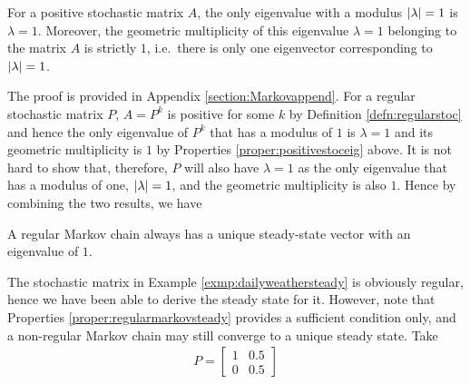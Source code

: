 \begin{proper}
\label{proper:positivestoceig}
For a positive stochastic matrix $A$, the only eigenvalue with a modulus $\abs{\lambda} = 1$ is $\lambda = 1$. Moreover, the geometric multiplicity of this eigenvalue $\lambda = 1$ belonging to the matrix $A$ is strictly $1$, i.e.\ there is only one eigenvector corresponding to $\abs{\lambda} = 1$.
\end{proper}
The proof is provided in Appendix \ref{section:Markovappend}. For a regular stochastic matrix $P$, $A = P^k$ is positive for some $k$ by Definition \ref{defn:regularstoc} and hence the only eigenvalue of $P^k$ that has a modulus of $1$ is $\lambda = 1$ and its geometric multiplicity is $1$ by Properties \ref{proper:positivestoceig} above. It is not hard to show that, therefore, $P$ will also have $\lambda = 1$ as the only eigenvalue that has a modulus of one, $\abs{\lambda} = 1$, and the geometric multiplicity is also $1$.\footnotemark{} Hence by combining the two results, we have
\begin{proper}
\label{proper:regularmarkovsteady}
A regular Markov chain always has a unique steady-state vector with an eigenvalue of $1$.  
\end{proper}
The stochastic matrix in Example \ref{exmp:dailyweathersteady} is obviously regular, hence we have been able to derive the steady state for it. However, note that Properties \ref{proper:regularmarkovsteady} provides a sufficient condition only, and a non-regular Markov chain may still converge to a unique steady state. Take
\begin{align*}
P = 
\begin{bmatrix}
1 & 0.5 \\
0 & 0.5
\end{bmatrix}
\end{align*}
